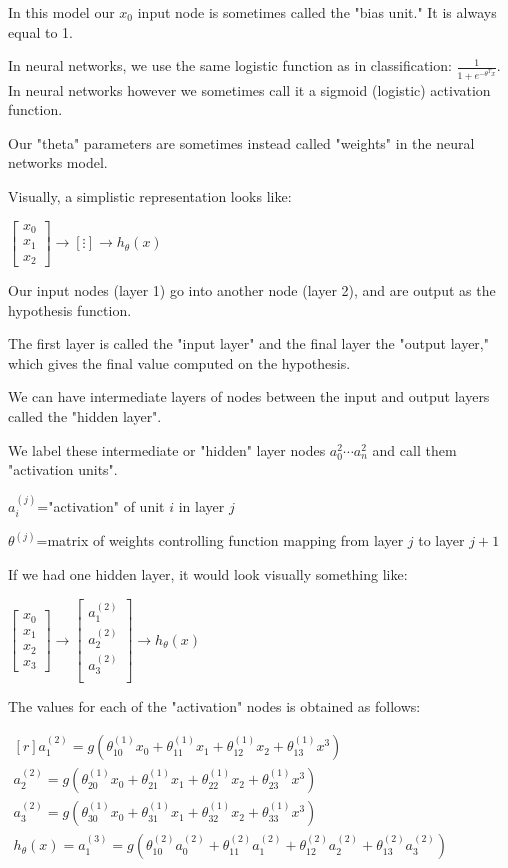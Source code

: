 \documentclass{article}
\begin{document}
In this model our $x_0$ input node is sometimes called the "bias unit." It is always equal to 1.

In neural networks, we use the same logistic function as in classification: $\frac{1}{1+e^{−\theta^Tx}}$. In neural networks however we sometimes call it a sigmoid (logistic) activation function.

Our "theta" parameters are sometimes instead called "weights" in the neural networks model.

Visually, a simplistic representation looks like:

$\left[\begin{matrix}
x_0 \\
x_1 \\
x_2
\end{matrix}\right]\to\left[\vdots \right]\to h_{\theta}(x)
$

Our input nodes (layer 1) go into another node (layer 2), and are output as the hypothesis function.

The first layer is called the "input layer" and the final layer the "output layer," which gives the final value computed on the hypothesis.

We can have intermediate layers of nodes between the input and output layers called the "hidden layer".

We label these intermediate or "hidden" layer nodes $a_0^2 \cdots a_n^2$ and call them "activation units".

$a_i^{(j)}$="activation" of unit $i$ in layer $j$

$\theta^{(j)}$=matrix of weights controlling function mapping from layer $j$ to layer $j+1$

If we had one hidden layer, it would look visually something like:


$\left[\begin{matrix}
x_0 \\
x_1 \\
x_2 \\
x_3
\end{matrix}\right]\to\left[
\begin{matrix}
a_1^{(2)} \\
a_2^{(2)} \\
a_3^{(2)} \\
\end{matrix}
 \right]\to h_{\theta}(x)
$


The values for each of the "activation" nodes is obtained as follows:

$
\begin{matrix*}[r]

a_1^{(2)}=g(\theta_{10}^{(1)}x_0+\theta_{11}^{(1)}x_1+\theta_{12}^{(1)}x_2+\theta_{13}^{(1)}x^3) \\
a_2^{(2)}=g(\theta_{20}^{(1)}x_0+\theta_{21}^{(1)}x_1+\theta_{22}^{(1)}x_2+\theta_{23}^{(1)}x^3) \\
a_3^{(2)}=g(\theta_{30}^{(1)}x_0+\theta_{31}^{(1)}x_1+\theta_{32}^{(1)}x_2+\theta_{33}^{(1)}x^3) \\
h_{\theta}(x)=a_1^{(3)}=g(\theta_{10}^{(2)}a_0^{(2)}+\theta_{11}^{(2)}a_1^{(2)}+\theta_{12}^{(2)}a_2^{(2)}+\theta_{13}^{(2)}a_3^{(2)})
\end{matrix*}
$
\end{document}

